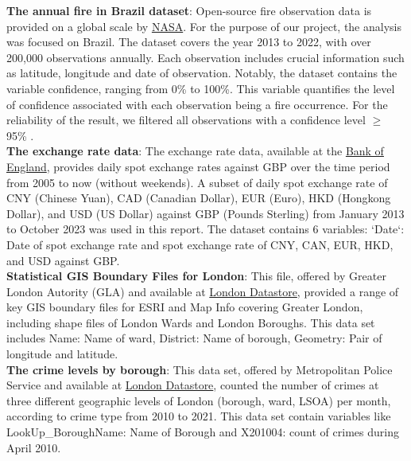 \documentclass{article}\usepackage[]{graphicx}\usepackage[]{xcolor}
\begin{document}
\noindent
\textbf{The annual fire in Brazil dataset}: Open-source fire observation data is provided on a global scale by \href{https://firms.modaps.eosdis.nasa.gov/}{NASA}. For the purpose of our project, 
the analysis was focused on Brazil. The dataset covers the year 2013 to 2022, with over 200,000 observations annually. Each observation includes crucial information such as latitude, longitude and date of observation. Notably, the dataset contains the variable confidence, ranging from 0\% to 100\%. This variable quantifies the level of confidence associated with each observation being a fire occurrence. For the reliability of the result, we filtered all observations with a confidence level $\ge$ 95\% \cite{nasa_confidence}.\\


\noindent
\textbf{The exchange rate data}: The exchange rate data, available at the \href{https://www.bankofengland.co.uk/boeapps/database/index.asp?first=yes&SectionRequired=I&HideNums=-1&ExtraInfo=true&Travel=NIx}{Bank of England}, provides daily spot exchange rates against GBP over the time period from 2005 to now (without weekends). A subset of daily spot exchange rate of CNY (Chinese Yuan), CAD (Canadian Dollar), EUR (Euro), HKD (Hongkong Dollar), and USD (US Dollar) against GBP (Pounds Sterling) from January 2013 to October 2023 was used in this report. The dataset contains 6 variables: `Date`: Date of spot exchange rate and spot exchange rate of CNY, CAN, EUR, HKD, and USD against GBP.\\

\noindent
\textbf{Statistical GIS Boundary Files for London}: This file, offered by Greater London Autority (GLA) and available at \href{https://data.london.gov.uk/dataset/statistical-gis-boundary-files-london}{London Datastore}, provided a range of key GIS boundary files for ESRI and Map Info covering Greater London, including shape files of London Wards and London Boroughs. This data set includes Name: Name of ward, District: Name of borough, Geometry: Pair of longitude and latitude.\\

\noindent
\textbf{The crime levels by borough}: This data set, offered by Metropolitan Police Service and available at \href{https://data.london.gov.uk/dataset/recorded_crime_summary}{London Datastore}, counted the number of crimes at three different geographic levels of London (borough, ward, LSOA) per month, according to crime type from 2010 to 2021. This data set contain variables like LookUp\_BoroughName: Name of Borough and X201004: count of crimes during April 2010.\\
\end{document}
